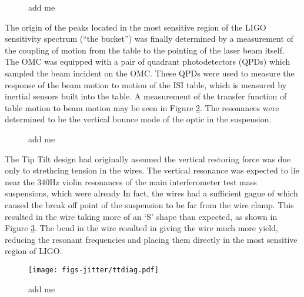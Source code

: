 \begin{figure}
  \begin{center}
  \leavevmode
  \end{center}
  \caption[add me]{add me}
  \label{fig:TT0photos}
\end{figure}

The origin of the peaks located in the most sensitive region of the LIGO sensitivity spectrum (``the bucket'') was finally determined by a measurement of the coupling of motion from the table to the pointing of the laser beam itself. %
The OMC was equipped with a pair of quadrant photodetectors (QPDs) which sampled the beam incident on the OMC. %
These QPDs were used to measure the response of the beam motion to motion of the ISI table, which is measured by inertial sensors built into the table. %
A measurement of the transfer function of table motion to beam motion may be seen in Figure \ref{fig:TTbounceTF}. %
The resonances were determined to be the vertical bounce mode of the optic in the suspension. %

\begin{figure}
  \begin{center}
  \leavevmode
  \end{center}
  \caption[add me]{add me}
  \label{fig:TTbounceTF}
\end{figure}

The Tip Tilt design had originally assumed the vertical restoring force was due only to strethcing tension in the wires. %
The vertical resonance was expected to lie near the 340Hz violin resonances of the main interferometer test mass suspensions, which were already In fact, the wires had a sufficient gague of  which caused the break off point of the suspension to be far from the wire clamp. %
This resulted in the wire taking more of an `S' shape than expected, as shown in Figure \ref{fig:ttdiag}. %
The bend in the wire resulted in giving the wire much more yield, reducing the resonant frequencies and placing them directly in the most sensitive region of LIGO. %

\begin{figure}
  \begin{center}
  \leavevmode
  \texttt{[image: figs-jitter/ttdiag.pdf]}
  \end{center}
  \caption[add me]{add me}
  \label{fig:ttdiag}
\end{figure}

